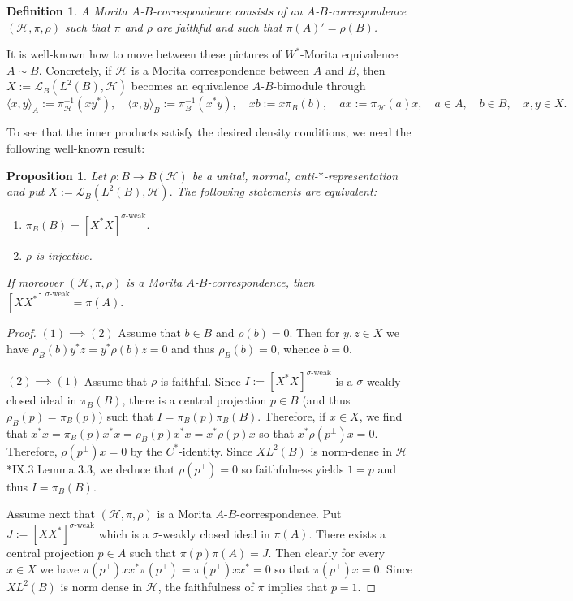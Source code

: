 \documentclass[reqno]{amsart}
\numberwithin{equation}{section}
\newtheorem{Def}[Theorem]{Definition}
\newtheorem{Prop}[Theorem]{Proposition}
\begin{document}
\begin{Def}\label{definitionn}
    A Morita $A$-$B$-correspondence consists of an $A$-$B$-correspondence $(\mathcal{H}, \pi, \rho)$ such that $\pi$ and $\rho$ are faithful and such that $\pi(A)'= \rho(B)$. 
\end{Def}

It is well-known how to move between these pictures of $W^*$-Morita equivalence $A \sim B$. Concretely, if $\mathcal{H}$ is a Morita correspondence between $A$ and $B$, then $X:= \mathscr{L}_B(L^2(B), \mathcal{H})$ becomes an equivalence $A$-$B$-bimodule through 
$$\langle x,y\rangle_A:= \pi_\mathcal{H}^{-1}(xy^*), \quad \langle x,y\rangle_B := \pi_B^{-1}(x^*y), \quad xb := x \pi_B(b), \quad ax := \pi_\mathcal{H}(a)x, \quad a\in A, \quad b\in B, \quad x,y \in X.$$

To see that the inner products satisfy the desired density conditions, we need the following well-known result:

\begin{Prop} Let $\rho: B \to B(\mathcal{H})$ be a unital, normal, anti-$*$-representation and put $X:= \mathscr{L}_B(L^2(B), \mathcal{H}).$
    The following statements are equivalent:
    \begin{enumerate}\setlength\itemsep{-0.5em}
        \item $\pi_B(B) = [X^*X]^{\sigma\text{-weak}}.$
        \item $\rho$ is injective.
    \end{enumerate}
    If moreover $(\mathcal{H}, \pi, \rho)$ is a Morita $A$-$B$-correspondence, then $[XX^*]^{\sigma\text{-weak}}= \pi(A).$
\end{Prop}
\begin{proof} $(1)\implies (2)$ Assume that $b\in B$ and $\rho(b)= 0$. Then for $y,z \in X$ we have
$\rho_B(b)y^*z = y^* \rho(b)z = 0$
and thus $\rho_B(b) = 0$, whence $b= 0$.

$(2)\implies (1)$ Assume that $\rho$ is faithful. Since $I:= [X^*X]^{\sigma\text{-weak}}$ is a $\sigma$-weakly closed ideal in $\pi_B(B)$, there is a central projection $p\in B$ (and thus $\rho_B(p) = \pi_B(p)$) such that $I = \pi_B(p) \pi_B(B)$. Therefore, if $x\in X$, we find that 
$x^*x = \pi_B(p) x^*x = \rho_B(p)x^*x = x^* \rho(p)x$
so that $x^*\rho(p^\perp)x= 0$. Therefore, $\rho(p^\perp)x=0$ by the $C^*$-identity. Since $X L^2(B)$ is norm-dense in $\mathcal{H}$ \cite{Tak03}*{IX.3 Lemma 3.3}, we deduce that $\rho(p^\perp) = 0$ so faithfulness yields $1= p$ and thus $I = \pi_B(B)$.

Assume next that $(\mathcal{H}, \pi, \rho)$ is a Morita $A$-$B$-correspondence. Put $J:= [XX^*]^{\sigma\text{-weak}}$ which is a $\sigma$-weakly closed ideal in $\pi(A)$. There exists a central projection $p\in A$ such that $\pi(p)\pi(A)= J$. Then clearly for every $x\in X$ we have 
$\pi(p^\perp)xx^* \pi(p^\perp) = \pi(p^\perp)xx^* = 0$
so that $\pi(p^\perp)x= 0$. Since $XL^2(B)$ is norm dense in $\mathcal{H}$, the faithfulness of $\pi$ implies that $p=1$.
\end{proof}
\end{document}
